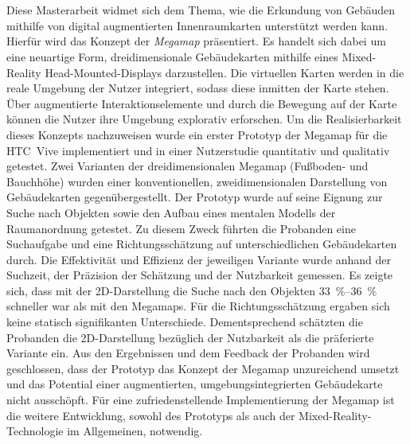 \chapter*{\abstractname}
\thispagestyle{empty}

Diese Masterarbeit widmet sich dem Thema, wie die Erkundung von Gebäuden mithilfe von digital augmentierten Innenraumkarten unterstützt werden kann.
Hierfür wird das Konzept der \emph{Megamap} präsentiert.
Es handelt sich dabei um eine neuartige Form, dreidimensionale Gebäudekarten mithilfe eines Mixed-Reality Head-Mounted-Displays darzustellen.
Die virtuellen Karten werden in die reale Umgebung der Nutzer integriert, sodass diese inmitten der Karte stehen.
Über augmentierte Interaktionselemente und durch die Bewegung auf der Karte können die Nutzer ihre Umgebung explorativ erforschen.
Um die Realisierbarkeit dieses Konzepts nachzuweisen wurde ein erster Prototyp der Megamap für die HTC~Vive implementiert und in einer Nutzerstudie quantitativ und qualitativ getestet.
Zwei Varianten der dreidimensionalen Megamap (Fußboden- und Bauchhöhe) wurden einer konventionellen, zweidimensionalen Darstellung von Gebäudekarten gegenübergestellt.
Der Prototyp wurde auf seine Eignung zur Suche nach Objekten sowie den Aufbau eines mentalen Modells der Raumanordnung getestet.
Zu diesem Zweck führten die Probanden eine Suchaufgabe und eine Richtungsschätzung auf unterschiedlichen Gebäudekarten durch.
Die Effektivität und Effizienz der jeweiligen Variante wurde anhand der Suchzeit, der Präzision der Schätzung und der Nutzbarkeit gemessen.
Es zeigte sich, dass mit der 2D-Darstellung die Suche nach den Objekten \SIrange{33}{36}{\percent} schneller war als mit den Megamaps.
Für die Richtungsschätzung ergaben sich keine statisch signifikanten Unterschiede.
Dementsprechend schätzten die Probanden die 2D-Darstellung bezüglich der Nutzbarkeit als die präferierte Variante ein.
Aus den Ergebnissen und dem Feedback der Probanden wird geschlossen, dass der Prototyp das Konzept der Megamap unzureichend umsetzt und das Potential einer augmentierten, umgebungsintegrierten Gebäudekarte nicht ausschöpft.
Für eine zufriedenstellende Implementierung der Megamap ist die weitere Entwicklung, sowohl des Prototyps als auch der Mixed-Reality-Technologie im Allgemeinen, notwendig.

\cleardoublepage

